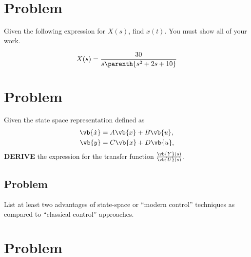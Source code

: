 \documentclass[titlepage, 11pt, reqno]{article}    %
\begin{document}
\begin{figure*}[htbp]
\centering
\begin{scaletikzpicturetowidth}{0.95\textwidth}
\end{scaletikzpicturetowidth}
\end{figure*}

\newpage
\thispagestyle{plain}

\section{Problem}
Given the following expression for \( X(s) \), find \( x(t)\). 
You must show all of your work.

\begin{align*}
    X(s) = \frac{30}{s\parenth{s^2 + 2s + 10}}
\end{align*}

\clearpage\newpage
\section{Problem}
Given the state space representation defined as
\begin{align*}
    \vb{\dot{x}} &= A \vb{x} + B \vb{u}, \\
    \vb{y} &= C \vb{x} + D\vb{u},
\end{align*}
\textbf{DERIVE} the expression for the transfer function \(\frac{\vb{Y}(s)}{\vb{U}(s)}\).
\vspace{13cm}
\subsection{Problem}

List at least two advantages of state-space or ``modern control'' techniques as compared to ``classical control'' approaches.
\vspace{5cm}
\clearpage
\section{Problem}
\end{document}
